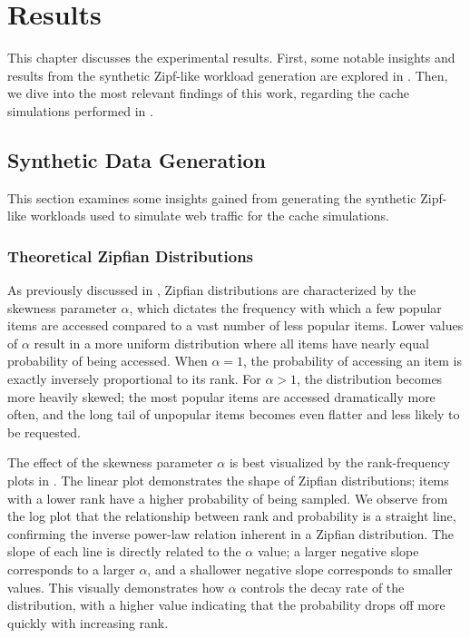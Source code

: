 \chapter{Results}\label{chapter:results}

This chapter discusses the experimental results. First, some notable insights and results from the synthetic Zipf-like workload generation are explored in . Then, we dive into the most relevant findings of this work, regarding the cache simulations performed in .

\section{Synthetic Data Generation}\label{res:zipf-gen}

This section examines some insights gained from generating the synthetic Zipf-like workloads used to simulate web traffic for the cache simulations.

\subsection{Theoretical Zipfian Distributions}\label{theoretical-zipf}

As previously discussed in , Zipfian distributions are characterized by the skewness parameter $\alpha$, which dictates the frequency with which a few popular items are accessed compared to a vast number of less popular items. Lower values of $\alpha$ result in a more uniform distribution where all items have nearly equal probability of being accessed. When $\alpha=1$, the probability of accessing an item is exactly inversely proportional to its rank. For $\alpha>1$, the distribution becomes more heavily skewed; the most popular items are accessed dramatically more often, and the long tail of unpopular items becomes even flatter and less likely to be requested. 

The effect of the skewness parameter $\alpha$ is best visualized by the rank-frequency plots in . The linear plot demonstrates the shape of Zipfian distributions; items with a lower rank have a higher probability of being sampled. We observe from the log plot that the relationship between rank and probability is a straight line, confirming the inverse power-law relation inherent in a Zipfian distribution. The slope of each line is directly related to the $\alpha$ value; a larger negative slope corresponds to a larger $\alpha$, and a shallower negative slope corresponds to smaller values. This visually demonstrates how $\alpha$ controls the decay rate of the distribution, with a higher value indicating that the probability drops off more quickly with increasing rank.


